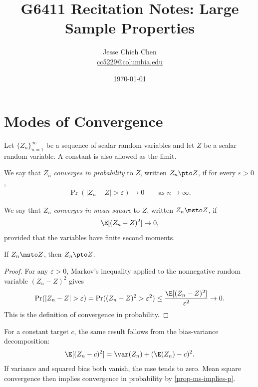 \documentclass[a4paper,12pt]{article}
\title{G6411 Recitation Notes: \glsentryshort{ols} Large Sample Properties}
\author{Jesse Chieh Chen\\\href{mailto:cc5229@columbia.edu}{cc5229@columbia.edu}}
\date{\today}
\begin{document}
\appendix
\section{Modes of Convergence}

Let $\{Z_n\}_{n=1}^{\infty}$ be a sequence of scalar random variables and let $Z$ be a scalar random variable.
A constant is also allowed as the limit.

\begin{definition}
	We say that $Z_n$ \emph{converges in probability} to $Z$, written $Z_n\pto Z$, if
	for every $\varepsilon>0$,
	\begin{align}\label{eq-probability-convergence}
		\Pr(|Z_n-Z|>\varepsilon)\to0
		\qquad\text{as }n\to\infty.
	\end{align}
\end{definition}

\begin{definition}
	We say that $Z_n$ \emph{converges in mean square} to $Z$, written $Z_n\msto Z$, if
	\begin{align}\label{eq-mean-square-convergence}
		\E[(Z_n-Z)^2]\to0,
	\end{align}
	provided that the variables have finite second moments.
\end{definition}

\begin{proposition}\label{prop-ms-implies-p}
	If $Z_n\msto Z$, then $Z_n\pto Z$.
\end{proposition}
\begin{proof}
	For any $\varepsilon>0$, Markov's inequality applied to the nonnegative random variable $(Z_n-Z)^2$ gives
	\begin{align*}
		\Pr(|Z_n-Z|>\varepsilon)
		=\Pr((Z_n-Z)^2>\varepsilon^2)
		\le\frac{\E[(Z_n-Z)^2]}{\varepsilon^2}
		\to0.
	\end{align*}
	This is the definition of convergence in probability.
\end{proof}

\begin{remark}
	For a constant target $c$, the same result follows from the bias-variance decomposition:
	\begin{align}\label{eq-mse-decomposition}
		\E[(Z_n-c)^2]=\var(Z_n)+(\E(Z_n)-c)^2.
	\end{align}
	If variance and squared bias both vanish, the \gls{mse} tends to zero.
	Mean square convergence then implies convergence in probability by \autoref{prop-ms-implies-p}.
\end{remark}
\end{document}
